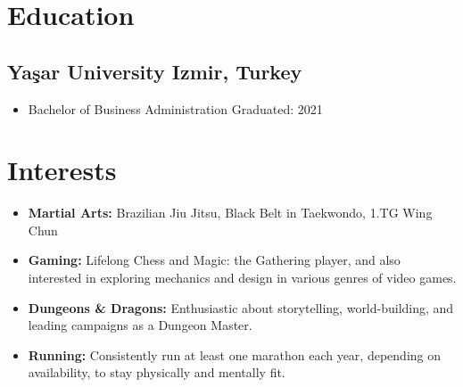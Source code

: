 \documentclass[11pt]{article}
\newcommand{\rside}[1]{
  \hfill {\normalfont\color{accent} #1}%
}
\begin{document}
\section{Education}
\subsection{Yaşar University \rside{Izmir, Turkey}}
\begin{itemize}
    \item{Bachelor of Business Administration \rside{Graduated: 2021}}
\end{itemize}
\section{Interests}
\begin{itemize}
    \item \textbf{Martial Arts:} Brazilian Jiu Jitsu, Black Belt in Taekwondo, 1.TG Wing Chun
    \item \textbf{Gaming:} Lifelong Chess and Magic: the Gathering player, and also interested in exploring mechanics and design in various genres of video games.
    \item \textbf{Dungeons \& Dragons:} Enthusiastic about storytelling, world-building, and leading campaigns as a Dungeon Master.
    \item \textbf{Running:} Consistently run at least one marathon each year, depending on availability, to stay physically and mentally fit.
\end{itemize}
\end{document}
